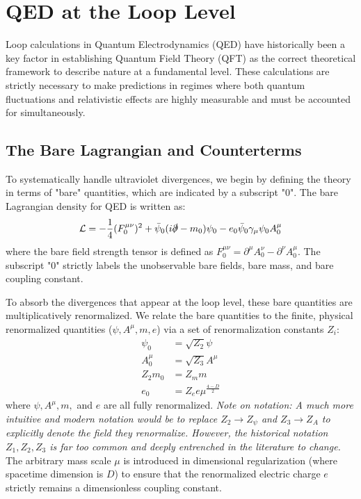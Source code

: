 \chapter{QED at the Loop Level}

Loop calculations in Quantum Electrodynamics (QED) have historically been a key factor in establishing Quantum Field Theory (QFT) as the correct theoretical framework to describe nature at a fundamental level. These calculations are strictly necessary to make predictions in regimes where both quantum fluctuations and relativistic effects are highly measurable and must be accounted for simultaneously.

\section{The Bare Lagrangian and Counterterms}

To systematically handle ultraviolet divergences, we begin by defining the theory in terms of "bare" quantities, which are indicated by a subscript "0". The bare Lagrangian density for QED is written as:
\[ \mathcal{L} = -\frac{1}{4}(F_0^{\mu\nu})^2 + \bar{\psi}_0(i\slashed{\partial} - m_0)\psi_0 - e_0 \bar{\psi}_0 \gamma_\mu \psi_0 A_0^\mu \]
where the bare field strength tensor is defined as $F_0^{\mu\nu} = \partial^\mu A_0^\nu - \partial^\nu A_0^\mu$. The subscript "0" strictly labels the unobservable bare fields, bare mass, and bare coupling constant.

To absorb the divergences that appear at the loop level, these bare quantities are multiplicatively renormalized. We relate the bare quantities to the finite, physical renormalized quantities ($\psi, A^\mu, m, e$) via a set of renormalization constants $Z_i$:
\[
    \begin{aligned}
        \psi_0  & = \sqrt{Z_2} \psi           \\
        A_0^\mu & = \sqrt{Z_3} A^\mu          \\
        Z_2 m_0 & = Z_m m                     \\
        e_0     & = Z_e e \mu^{\frac{4-D}{2}}
    \end{aligned}
\]
where $\psi, A^\mu, m,$ and $e$ are all fully renormalized.
\textit{Note on notation: A much more intuitive and modern notation would be to replace $Z_2 \to Z_\psi$ and $Z_3 \to Z_A$ to explicitly denote the field they renormalize. However, the historical notation $Z_1, Z_2, Z_3$ is far too common and deeply entrenched in the literature to change.}
The arbitrary mass scale $\mu$ is introduced in dimensional regularization (where spacetime dimension is $D$) to ensure that the renormalized electric charge $e$ strictly remains a dimensionless coupling constant.

